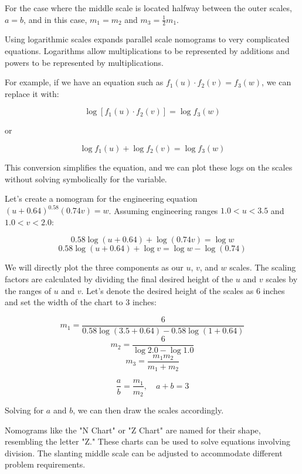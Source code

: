 \documentclass{l4proj}
\begin{document}
For the case where the middle scale is located halfway between the outer scales, $a = b$, and in this case, $m_1 = m_2$ and $m_3 = \frac{1}{2}m_1$.

Using logarithmic scales expands parallel scale nomograms to very complicated equations. Logarithms allow multiplications to be represented by additions and powers to be represented by multiplications.

For example, if we have an equation such as $f_1(u) \cdot f_2(v) = f_3(w)$, we can replace it with:

\[ \log[f_1(u) \cdot f_2(v)] = \log f_3(w) \]

or

\[ \log f_1(u) + \log f_2(v) = \log f_3(w) \]

This conversion simplifies the equation, and we can plot these logs on the scales without solving symbolically for the variable.

Let's create a nomogram for the engineering equation $(u + 0.64)^{0.58}(0.74v) = w$. Assuming engineering ranges $1.0 < u < 3.5$ and $1.0 < v < 2.0$:

\[ 0.58 \log(u + 0.64) + \log(0.74v) = \log w \]
\[ 0.58 \log(u + 0.64) + \log v = \log w - \log(0.74) \]

We will directly plot the three components as our $u$, $v$, and $w$ scales. The scaling factors are calculated by dividing the final desired height of the $u$ and $v$ scales by the ranges of $u$ and $v$. Let's denote the desired height of the scales as 6 inches and set the width of the chart to 3 inches:

\[ m_1 = \frac{6}{0.58 \log(3.5 + 0.64) - 0.58 \log(1 + 0.64)} \]
\[ m_2 = \frac{6}{\log 2.0 - \log 1.0} \]
\[ m_3 = \frac{m_1 m_2}{m_1 + m_2} \]

\[ \frac{a}{b} = \frac{m_1}{m_2}, \quad a + b = 3 \]

Solving for $a$ and $b$, we can then draw the scales accordingly. \citep{doerfler_art_2008}

Nomograms like the "N Chart" or "Z Chart" are named for their shape, resembling the letter "Z." These charts can be used to solve equations involving division. The slanting middle scale can be adjusted to accommodate different problem requirements.
\end{document}
